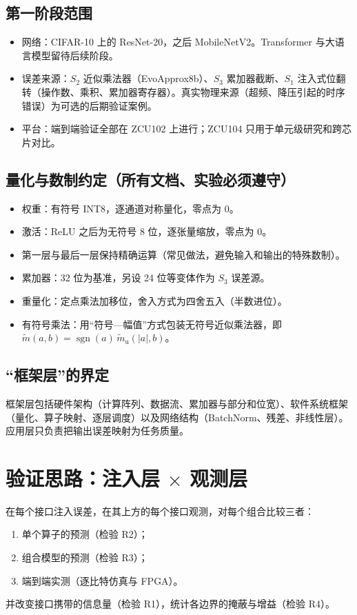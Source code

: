 \documentclass[11pt,a4paper]{ctexart}
\begin{document}
\subsection{第一阶段范围}
\begin{itemize}[leftmargin=*]
  \item 网络：CIFAR-10 上的 ResNet-20，之后 MobileNetV2。Transformer 与大语言模型留待后续阶段。
  \item 误差来源：$S_2$ 近似乘法器（EvoApprox8b）、$S_3$ 累加器截断、$S_1$ 注入式位翻转（操作数、乘积、累加器寄存器）。真实物理来源（超频、降压引起的时序错误）为可选的后期验证案例。
  \item 平台：端到端验证全部在 ZCU102 上进行；ZCU104 只用于单元级研究和跨芯片对比。
\end{itemize}

\subsection{量化与数制约定（所有文档、实验必须遵守）}
\begin{itemize}[leftmargin=*]
  \item 权重：有符号 INT8，逐通道对称量化，零点为 0。
  \item 激活：ReLU 之后为无符号 8 位，逐张量缩放，零点为 0。
  \item 第一层与最后一层保持精确运算（常见做法，避免输入和输出的特殊数制）。
  \item 累加器：32 位为基准，另设 24 位等变体作为 $S_3$ 误差源。
  \item 重量化：定点乘法加移位，舍入方式为四舍五入（半数进位）。
  \item 有符号乘法：用“符号—幅值”方式包装无符号近似乘法器，即 $\tilde m(a,b) = \operatorname{sgn}(a)\,\tilde m_{\text{u}}(|a|, b)$。
\end{itemize}

\subsection{“框架层”的界定}
框架层包括硬件架构（计算阵列、数据流、累加器与部分和位宽）、软件系统框架（量化、算子映射、逐层调度）以及网络结构（BatchNorm、残差、非线性层）。应用层只负责把输出误差映射为任务质量。

\section{验证思路：注入层 $\times$ 观测层}
在每个接口注入误差，在其上方的每个接口观测，对每个组合比较三者：
\begin{enumerate}[leftmargin=*]
  \item 单个算子的预测（检验 R2）；
  \item 组合模型的预测（检验 R3）；
  \item 端到端实测（逐比特仿真与 FPGA）。
\end{enumerate}
并改变接口携带的信息量（检验 R1），统计各边界的掩蔽与增益（检验 R4）。
\end{document}
